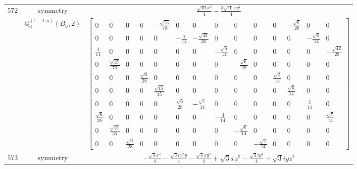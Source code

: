 \documentclass[fleqn,8pt,landscape]{jsarticle}
\begin{document}
\begin{longtable}{ccc}
$ 572 $ & $ \text{symmetry} $ & $ \frac{\sqrt{10} x^{3}}{4} - \frac{3 \sqrt{10} x y^{2}}{4} $ \\
$  $ & $ \mathbb{Q}_{3}^{(1,-1;a)}(B_{u},2) $ & $ \begin{bmatrix} 0 & 0 & 0 & 0 & - \frac{\sqrt{15}}{70} & 0 & 0 & 0 & 0 & 0 & 0 & - \frac{\sqrt{6}}{28} & 0 & 0 \\ 0 & 0 & 0 & 0 & 0 & - \frac{1}{14} & - \frac{\sqrt{42}}{28} & 0 & 0 & 0 & 0 & 0 & - \frac{\sqrt{6}}{14} & 0 \\ \frac{1}{14} & 0 & 0 & 0 & 0 & 0 & 0 & - \frac{\sqrt{6}}{14} & 0 & 0 & 0 & 0 & 0 & - \frac{\sqrt{42}}{28} \\ 0 & \frac{\sqrt{15}}{70} & 0 & 0 & 0 & 0 & 0 & 0 & - \frac{\sqrt{6}}{28} & 0 & 0 & 0 & 0 & 0 \\ 0 & 0 & 0 & \frac{\sqrt{6}}{28} & 0 & 0 & 0 & 0 & 0 & 0 & \frac{\sqrt{2}}{14} & 0 & 0 & 0 \\ 0 & 0 & 0 & 0 & \frac{\sqrt{15}}{35} & 0 & 0 & 0 & 0 & 0 & 0 & \frac{\sqrt{6}}{14} & 0 & 0 \\ 0 & 0 & 0 & 0 & 0 & \frac{\sqrt{6}}{28} & - \frac{\sqrt{7}}{14} & 0 & 0 & 0 & 0 & 0 & \frac{3}{14} & 0 \\ \frac{\sqrt{6}}{28} & 0 & 0 & 0 & 0 & 0 & 0 & - \frac{3}{14} & 0 & 0 & 0 & 0 & 0 & \frac{\sqrt{7}}{14} \\ 0 & \frac{\sqrt{15}}{35} & 0 & 0 & 0 & 0 & 0 & 0 & - \frac{\sqrt{6}}{14} & 0 & 0 & 0 & 0 & 0 \\ 0 & 0 & \frac{\sqrt{6}}{28} & 0 & 0 & 0 & 0 & 0 & 0 & - \frac{\sqrt{2}}{14} & 0 & 0 & 0 & 0 \end{bmatrix} $ \\ \hline
$ 573 $ & $ \text{symmetry} $ & $ - \frac{\sqrt{3} x^{3}}{4} - \frac{\sqrt{3} i x^{2} y}{4} - \frac{\sqrt{3} x y^{2}}{4} + \sqrt{3} x z^{2} - \frac{\sqrt{3} i y^{3}}{4} + \sqrt{3} i y z^{2} $ \\

\end{longtable}
\end{document}
